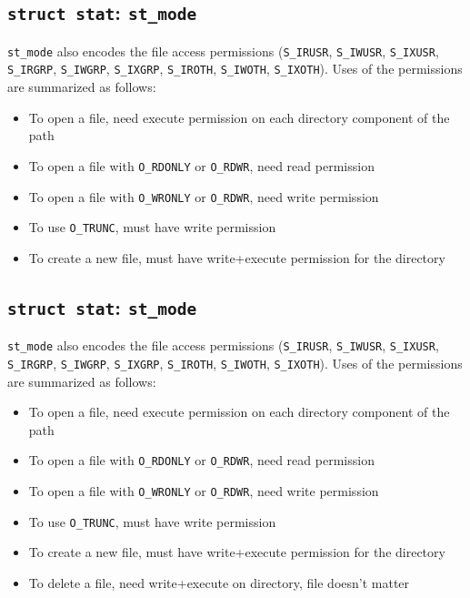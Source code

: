 \documentclass[xga]{xdvislides}
\begin{document}
\subsection{{\tt struct stat}: {\tt st\_mode}}
{\tt st\_mode} also encodes the file access permissions ({\tt S\_IRUSR},
{\tt S\_IWUSR}, {\tt S\_IXUSR}, {\tt S\_IRGRP}, {\tt S\_IWGRP}, {\tt S\_IXGRP},
{\tt S\_IROTH}, {\tt S\_IWOTH}, {\tt S\_IXOTH}).  Uses of the permissions are
summarized as follows:

\begin{itemize}
	\item To open a file, need execute permission on each directory component of the path
	\item To open a file with {\tt O\_RDONLY} or {\tt O\_RDWR}, need read permission
	\item To open a file with {\tt O\_WRONLY} or {\tt O\_RDWR}, need write permission
	\item To use {\tt O\_TRUNC}, must have write permission
	\item To create a new file, must have write+execute permission for the directory
\end{itemize}


\subsection{{\tt struct stat}: {\tt st\_mode}}
{\tt st\_mode} also encodes the file access permissions ({\tt S\_IRUSR},
{\tt S\_IWUSR}, {\tt S\_IXUSR}, {\tt S\_IRGRP}, {\tt S\_IWGRP}, {\tt S\_IXGRP},
{\tt S\_IROTH}, {\tt S\_IWOTH}, {\tt S\_IXOTH}).  Uses of the permissions are
summarized as follows:

\begin{itemize}
	\item To open a file, need execute permission on each directory component of the path
	\item To open a file with {\tt O\_RDONLY} or {\tt O\_RDWR}, need read permission
	\item To open a file with {\tt O\_WRONLY} or {\tt O\_RDWR}, need write permission
	\item To use {\tt O\_TRUNC}, must have write permission
	\item To create a new file, must have write+execute permission for the directory
	\item To delete a file, need write+execute on directory, file doesn't matter
\end{itemize}
\end{document}
